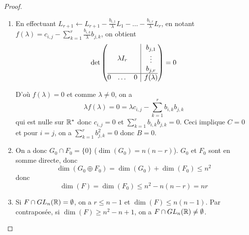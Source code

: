 \begin{proof}
\begin{enumerate}
        \item En effectuant $L_{r+1}\leftarrow L_{r+1}-\frac{b_{i,1}}{\lambda}L_{1}-\dots-\frac{b_{i,r}}{\lambda}L_{r}$, en notant $f(\lambda)=c_{i,j}-\sum_{k=1}^{r}\frac{b_{i,k}}{\lambda}b_{j,k}$, on obtient 
        \begin{equation}
            \det\left(
				\begin{array}{@{}c|c@{}}
				\lambda
				I_{r} &
				\begin{matrix}
				b_{j,1}\\
						\vdots\\
						b_{j,r}
						\end{matrix}
						\\
					\hline
					\begin{matrix}
						0 &
						\dots
						& 0
						\end{matrix}
						& f(\lambda)
				\end{array}
			\right)=0
        \end{equation}

        D'où $f(\lambda)=0$ et comme $\lambda\neq0$, on a
        \begin{equation}
            \lambda f(\lambda)=0=\lambda c_{i,j}-\sum_{k=1}^{r}b_{i,k}b_{j,k}
        \end{equation}
        qui est nulle sur $\mathbb{R}^{*}$ donc $c_{i,j}=0$ et $\sum_{k=1}^{r}b_{i,k}b_{j,k}=0$. Ceci implique $C=0$ et pour $i=j$, on a $\sum_{k=1}^{r}b_{j,k}^{2}=0$ donc $B=0$.

        \item On a donc $G_{0}\cap F_{0}=\lbrace0\rbrace$ ($\dim(G_{0})=n(n-r)$). $G_{0}$ et $F_{0}$ sont en somme directe, donc 
        \begin{equation}
            \dim(G_{0}\oplus F_{0})=\dim(G_{0})+\dim(F_{0})\leqslant n^{2}
        \end{equation}
        donc 
        \begin{equation}
            \boxed{\dim(F)=\dim(F_{0})\leqslant n^{2}-n(n-r)=nr}
        \end{equation}

        \item Si $F\cap GL_{n}(\mathbb{R})=\emptyset$, on a $r\leqslant n-1$ et $\dim(F)\leqslant n(n-1)$. Par contraposée, si $\dim(F)\geqslant n^{2}-n+1$, on a $F\cap GL_{n}(\mathbb{R})\neq\emptyset$.
        

\end{enumerate}
\end{proof}
